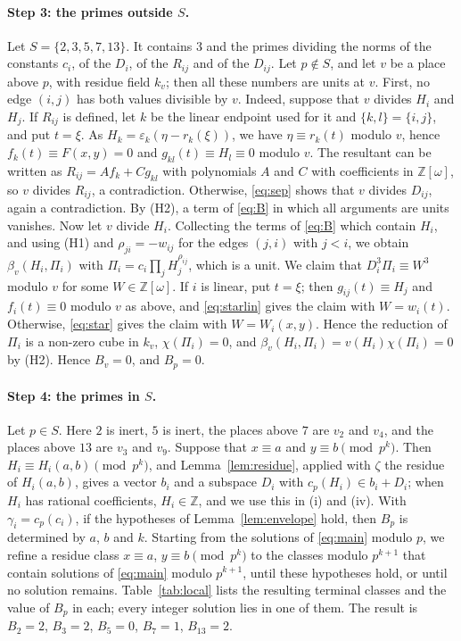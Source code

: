 \documentclass[11pt]{article}
\newcommand{\Z}{\mathbb{Z}}
\begin{document}
\paragraph{Step 3: the primes outside $S$.} Let $S=\{2,3,5,7,13\}$. It contains $3$ and the primes dividing the norms of the constants $c_i$, of the $D_i$, of the $R_{ij}$ and of the $D_{ij}$. Let $p\notin S$, and let $v$ be a place above $p$, with residue field $k_v$; then all these numbers are units at $v$. First, no edge $(i,j)$ has both values divisible by $v$. Indeed, suppose that $v$ divides $H_i$ and $H_j$. If $R_{ij}$ is defined, let $k$ be the linear endpoint used for it and $\{k,l\}=\{i,j\}$, and put $t=\xi$. As $H_k=\varepsilon_k(\eta-r_k(\xi))$, we have $\eta\equiv r_k(t)$ modulo $v$, hence $f_k(t)\equiv F(x,y)=0$ and $g_{kl}(t)\equiv H_l\equiv0$ modulo $v$. The resultant can be written as $R_{ij}=Af_k+Cg_{kl}$ with polynomials $A$ and $C$ with coefficients in $\Z[\omega]$, so $v$ divides $R_{ij}$, a contradiction. Otherwise, \eqref{eq:sep} shows that $v$ divides $D_{ij}$, again a contradiction. By (H2), a term of \eqref{eq:B} in which all arguments are units vanishes. Now let $v$ divide $H_i$. Collecting the terms of \eqref{eq:B} which contain $H_i$, and using (H1) and $\rho_{ji}=-w_{ij}$ for the edges $(j,i)$ with $j<i$, we obtain $\beta_v(H_i,\Pi_i)$ with $\Pi_i=c_i\prod_jH_j^{\rho_{ij}}$, which is a unit. We claim that $D_i^3\Pi_i\equiv W^3$ modulo $v$ for some $W\in\Z[\omega]$. If $i$ is linear, put $t=\xi$; then $g_{ij}(t)\equiv H_j$ and $f_i(t)\equiv0$ modulo $v$ as above, and \eqref{eq:starlin} gives the claim with $W=w_i(t)$. Otherwise, \eqref{eq:star} gives the claim with $W=W_i(x,y)$. Hence the reduction of $\Pi_i$ is a non-zero cube in $k_v$, $\chi(\Pi_i)=0$, and $\beta_v(H_i,\Pi_i)=v(H_i)\chi(\Pi_i)=0$ by (H2). Hence $B_v=0$, and $B_p=0$.

\paragraph{Step 4: the primes in $S$.} Let $p\in S$. Here $2$ is inert, $5$ is inert, the places above $7$ are $v_{2}$ and $v_{4}$, and the places above $13$ are $v_{3}$ and $v_{9}$. Suppose that $x\equiv a$ and $y\equiv b\pmod{p^k}$. Then $H_i\equiv H_i(a,b)\pmod{p^k}$, and Lemma~\ref{lem:residue}, applied with $\zeta$ the residue of $H_i(a,b)$, gives a vector $b_i$ and a subspace $D_i$ with $c_p(H_i)\in b_i+D_i$; when $H_i$ has rational coefficients, $H_i\in\Z$, and we use this in (i) and (iv). With $\gamma_i=c_p(c_i)$, if the hypotheses of Lemma~\ref{lem:envelope} hold, then $B_p$ is determined by $a$, $b$ and $k$. Starting from the solutions of \eqref{eq:main} modulo $p$, we refine a residue class $x\equiv a$, $y\equiv b\pmod{p^k}$ to the classes modulo $p^{k+1}$ that contain solutions of \eqref{eq:main} modulo $p^{k+1}$, until these hypotheses hold, or until no solution remains. Table~\ref{tab:local} lists the resulting terminal classes and the value of $B_p$ in each; every integer solution lies in one of them. The result is $B_{2}=2$, $B_{3}=2$, $B_{5}=0$, $B_{7}=1$, $B_{13}=2$.
\end{document}
